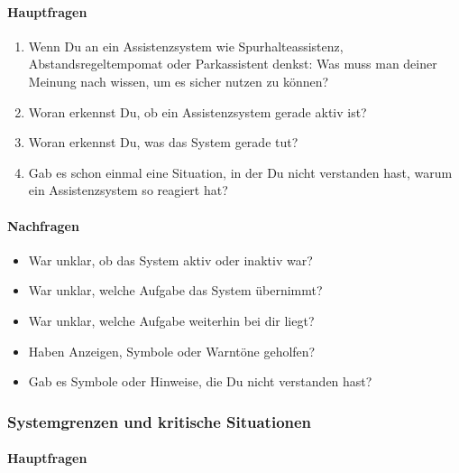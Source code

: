 \paragraph*{Hauptfragen}

\begin{enumerate}
    \item Wenn Du an ein Assistenzsystem wie Spurhalteassistenz,
          Abstandsregeltempomat oder Parkassistent denkst:
          Was muss man deiner Meinung nach wissen, um es sicher nutzen
          zu können?

    \item Woran erkennst Du, ob ein Assistenzsystem gerade aktiv ist?

    \item Woran erkennst Du, was das System gerade tut?

    \item Gab es schon einmal eine Situation, in der Du nicht verstanden
          hast, warum ein Assistenzsystem so reagiert hat?
\end{enumerate}

\paragraph*{Nachfragen}

\begin{itemize}
    \item War unklar, ob das System aktiv oder inaktiv war?
    \item War unklar, welche Aufgabe das System übernimmt?
    \item War unklar, welche Aufgabe weiterhin bei dir liegt?
    \item Haben Anzeigen, Symbole oder Warntöne geholfen?
    \item Gab es Symbole oder Hinweise, die Du nicht verstanden hast?
\end{itemize}


\subsubsection{Systemgrenzen und kritische Situationen}

\paragraph*{Hauptfragen}

